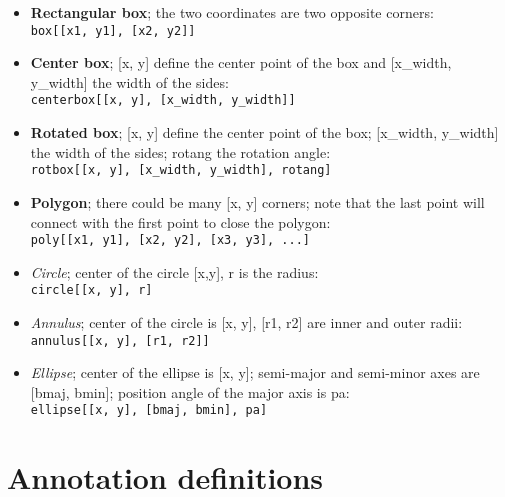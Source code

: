 \begin{itemize}

\item {\bf Rectangular box}; the two coordinates are two opposite corners:\\

{\tt box[[x1, y1], [x2, y2]]}

\item {\bf Center box}; [x, y] define the center point of the box and [x\_width, y\_width] the width of the sides:\\

{\tt centerbox[[x, y], [x\_width, y\_width]]}

\item {\bf Rotated box}; [x, y] define the center point of the box; [x\_width, y\_width] the width of the sides; rotang the rotation angle:\\

{\tt rotbox[[x, y], [x\_width, y\_width], rotang]}

\item {\bf Polygon}; there could be many [x, y] corners; note that the last point 
will connect with the first point to close the polygon:\\

{\tt poly[[x1, y1], [x2, y2], [x3, y3], ...]}

\item {\it Circle}; center of the circle [x,y], r is the radius:\\

{\tt circle[[x, y], r]}

\item {\it Annulus}; center of the circle is [x, y], [r1, r2] are inner and outer radii:\\

{\tt annulus[[x, y], [r1, r2]]}

\item {\it Ellipse}; center of the ellipse is [x, y]; semi-major and semi-minor axes are [bmaj, bmin]; position angle of the major axis is pa:\\

{\tt ellipse[[x, y], [bmaj, bmin], pa]}

\end{itemize}

\section{Annotation definitions}

